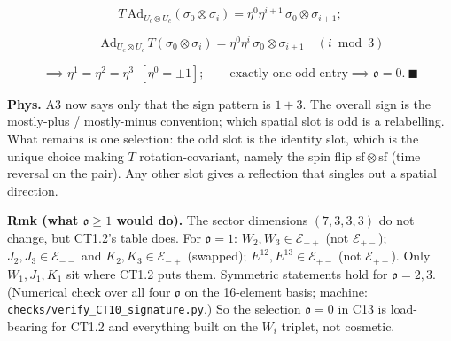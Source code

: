 \begin{theorem}
\[
T\,\mathrm{Ad}_{U_c\otimes U_c}(\sigma_0\otimes\sigma_i)=\eta^0\eta^{i+1}\,\sigma_0\otimes\sigma_{i+1};
\]

\[
\qquad \mathrm{Ad}_{U_c\otimes U_c}\,T(\sigma_0\otimes\sigma_i)=\eta^0\eta^{i}\,\sigma_0\otimes\sigma_{i+1}\quad(i\bmod3)
\]

\[
\implies\eta^1=\eta^2=\eta^3\ \ [\eta^0=\pm1];\qquad\text{exactly one odd entry}\implies\mathfrak o=0.\ \blacksquare
\]

\textbf{Phys.} A3 now says only that the sign pattern is $1+3$. The overall sign is the mostly-plus / mostly-minus convention; which spatial slot is odd is a relabelling. What remains is one selection: the odd slot is the identity slot, which is the unique choice making $T$ rotation-covariant, namely the spin flip $\mathrm{sf}\otimes\mathrm{sf}$ (time reversal on the pair). Any other slot gives a reflection that singles out a spatial direction.

\textbf{Rmk (what $\mathfrak o\ge1$ would do).} The sector dimensions $(7,3,3,3)$ do not change, but CT1.2's table does. For $\mathfrak o=1$: $W_2,W_3\in\mathcal E_{++}$ (not $\mathcal E_{+-}$); $J_2,J_3\in\mathcal E_{--}$ and $K_2,K_3\in\mathcal E_{-+}$ (swapped); $E^{12},E^{13}\in\mathcal E_{+-}$ (not $\mathcal E_{++}$). Only $W_1,J_1,K_1$ sit where CT1.2 puts them. Symmetric statements hold for $\mathfrak o=2,3$. (Numerical check over all four $\mathfrak o$ on the 16-element basis; machine: \texttt{checks/\allowbreak{}verify\_\allowbreak{}CT10\_\allowbreak{}signature.py}.) So the selection $\mathfrak o=0$ in C13 is load-bearing for CT1.2 and everything built on the $W_i$ triplet, not cosmetic.

\end{theorem}

